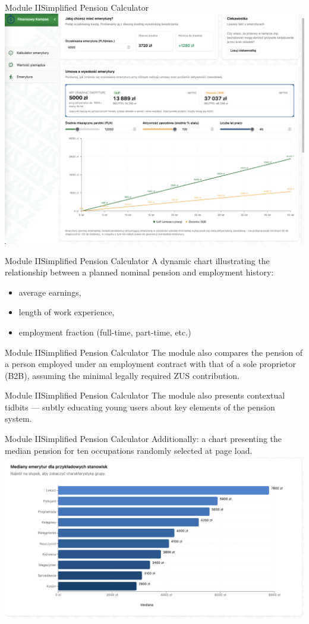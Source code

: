 \begin{frame}[t]{Module II}{Simplified Pension Calculator}
  \includegraphics[width=.8\textwidth]{img/module_2_simple_pension_calculator}
\end{frame}

\begin{frame}[t]{Module II}{Simplified Pension Calculator}
A dynamic chart illustrating the relationship between a planned nominal pension and employment history:
\begin{itemize}
  \item average earnings,
  \item length of work experience,
  \item employment fraction (full-time, part-time, etc.)
\end{itemize}
\end{frame}

\begin{frame}[t]{Module II}{Simplified Pension Calculator}
The module also compares the pension of a person employed under an employment contract
with that of a sole proprietor (B2B),
assuming the minimal legally required ZUS contribution.
\end{frame}

\begin{frame}[t]{Module II}{Simplified Pension Calculator}
The module also presents contextual tidbits ---
subtly educating young users about key elements of the pension system.
\end{frame}

\begin{frame}[t]{Module II}{Simplified Pension Calculator}
Additionally: a chart presenting the median pension for ten occupations
randomly selected at page load.
\\[2em]
\includegraphics[width=.8\textwidth]{img/module_2b_median_pensions}
\end{frame}

